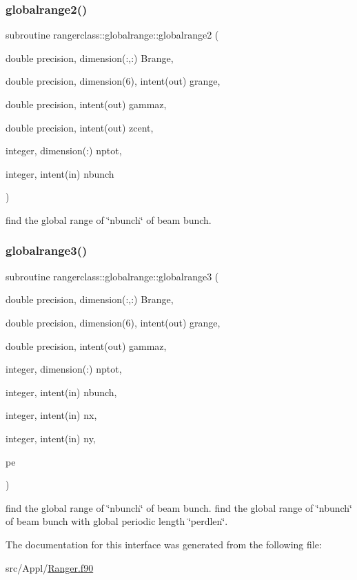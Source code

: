 \subsubsection{\texorpdfstring{globalrange2()}{globalrange2()}}
{\footnotesize\ttfamily subroutine rangerclass\+::globalrange\+::globalrange2 (\begin{DoxyParamCaption}\item[{double precision, dimension(\+:,\+:)}]{Brange,  }\item[{double precision, dimension(6), intent(out)}]{grange,  }\item[{double precision, intent(out)}]{gammaz,  }\item[{double precision, intent(out)}]{zcent,  }\item[{integer, dimension(\+:)}]{nptot,  }\item[{integer, intent(in)}]{nbunch }\end{DoxyParamCaption})}



find the global range of \char`\"{}nbunch\char`\"{} of beam bunch. 

\mbox{\label{interfacerangerclass_1_1globalrange_a5b959071ead119fc17254b0eb2ac8c28}} 
\subsubsection{\texorpdfstring{globalrange3()}{globalrange3()}}
{\footnotesize\ttfamily subroutine rangerclass\+::globalrange\+::globalrange3 (\begin{DoxyParamCaption}\item[{double precision, dimension(\+:,\+:)}]{Brange,  }\item[{double precision, dimension(6), intent(out)}]{grange,  }\item[{double precision, intent(out)}]{gammaz,  }\item[{integer, dimension(\+:)}]{nptot,  }\item[{integer, intent(in)}]{nbunch,  }\item[{integer, intent(in)}]{nx,  }\item[{integer, intent(in)}]{ny,  }\item[{}]{pe }\end{DoxyParamCaption})}



find the global range of \char`\"{}nbunch\char`\"{} of beam bunch. find the global range of \char`\"{}nbunch\char`\"{} of beam bunch with global periodic length \char`\"{}perdlen\char`\"{}. 



The documentation for this interface was generated from the following file\+:\begin{DoxyCompactItemize}
\item 
src/\+Appl/\mbox{\hyperlink{_ranger_8f90}{Ranger.\+f90}}\end{DoxyCompactItemize}
